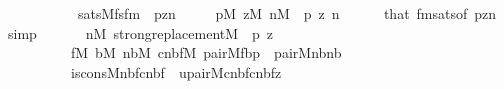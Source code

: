 \begin{isabellebody}
\ \ \ \ \ \ \ \ \ \ {\isasymlongleftrightarrow}\ sats{\isacharparenleft}{\kern0pt}M{\isacharcomma}{\kern0pt}fsfm{\isacharparenleft}{\kern0pt}{}{\isacharcomma}{\kern0pt}{}{\isacharcomma}{\kern0pt}{}{\isacharparenright}{\kern0pt}\ {\isacharcomma}{\kern0pt}\ {\isacharbrackleft}{\kern0pt}p{\isacharcomma}{\kern0pt}z{\isacharcomma}{\kern0pt}n{}{\isacharbrackright}{\kern0pt}{\isacharparenright}{\kern0pt}{\isachardoublequoteclose}\isanewline
\ \ \ \ \ {\isachardoublequoteopen}p{\isasymin}M{\isachardoublequoteclose}\ {\isachardoublequoteopen}z{\isasymin}M{\isachardoublequoteclose}\ {\isachardoublequoteopen}n{}{\isasymin}M{\isachardoublequoteclose}\ \ p\ z\ n{}\isanewline
\ \ \ \ \isamarkupfalse%
\ that\ fmsats{\isacharbrackleft}{\kern0pt}of\ {\isachardoublequoteopen}{\isacharbrackleft}{\kern0pt}p{\isacharcomma}{\kern0pt}z{\isacharcomma}{\kern0pt}n{}{\isacharbrackright}{\kern0pt}{\isachardoublequoteclose}{\isacharbrackright}{\kern0pt}\ \isamarkupfalse%
\ simp\isanewline
\ \ \isamarkupfalse%
\isanewline
\ \ \isamarkupfalse%
\ {\isachardoublequoteopen}{\isasymforall}n{}{\isasymin}M{\isachardot}{\kern0pt}\ strong{\isacharunderscore}{\kern0pt}replacement{\isacharparenleft}{\kern0pt}{\isacharhash}{\kern0pt}{\isacharhash}{\kern0pt}M{\isacharcomma}{\kern0pt}\ {\isasymlambda}\ p\ z{\isachardot}{\kern0pt}\isanewline
\ \ \ \ \ \ \ \ \ \ {\isasymexists}f{\isasymin}M{\isachardot}{\kern0pt}\ {\isasymexists}b{\isasymin}M{\isachardot}{\kern0pt}\ {\isasymexists}nb{\isasymin}M{\isachardot}{\kern0pt}\ {\isasymexists}cnbf{\isasymin}M{\isachardot}{\kern0pt}\ pair{\isacharparenleft}{\kern0pt}{\isacharhash}{\kern0pt}{\isacharhash}{\kern0pt}M{\isacharcomma}{\kern0pt}f{\isacharcomma}{\kern0pt}b{\isacharcomma}{\kern0pt}p{\isacharparenright}{\kern0pt}\ {\isacharampersand}{\kern0pt}\ pair{\isacharparenleft}{\kern0pt}{\isacharhash}{\kern0pt}{\isacharhash}{\kern0pt}M{\isacharcomma}{\kern0pt}n{}{\isacharcomma}{\kern0pt}b{\isacharcomma}{\kern0pt}nb{\isacharparenright}{\kern0pt}\ {\isacharampersand}{\kern0pt}\isanewline
\ \ \ \ \ \ \ \ \ \ is{\isacharunderscore}{\kern0pt}cons{\isacharparenleft}{\kern0pt}{\isacharhash}{\kern0pt}{\isacharhash}{\kern0pt}M{\isacharcomma}{\kern0pt}nb{\isacharcomma}{\kern0pt}f{\isacharcomma}{\kern0pt}cnbf{\isacharparenright}{\kern0pt}\ {\isacharampersand}{\kern0pt}\ upair{\isacharparenleft}{\kern0pt}{\isacharhash}{\kern0pt}{\isacharhash}{\kern0pt}M{\isacharcomma}{\kern0pt}cnbf{\isacharcomma}{\kern0pt}cnbf{\isacharcomma}{\kern0pt}z{\isacharparenright}{\kern0pt}{\isacharparenright}{\kern0pt}{\isachardoublequoteclose}\isanewline

\end{isabellebody}
